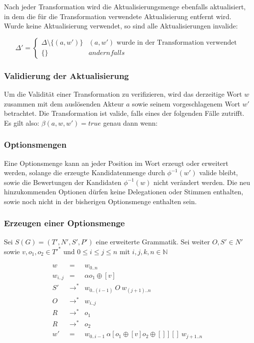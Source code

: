 \documentclass[]{article}
\begin{document}
Nach jeder Transformation wird die Aktualisierungsmenge ebenfalls aktualisiert, in dem die für die Transformation verwendete Aktualisierung entfernt wird. Wurde keine Aktualisierung verwendet, so sind alle Aktualisierungen invalide:

\[ 
  \Delta' = 
  \begin{cases}
    \Delta\setminus \{ (a, w' )\} & (a,w')\text{ wurde in der Transformation verwendet} \\
    \{\} & andernfalls
  \end{cases}
\] 


\subsubsection*{Validierung der Aktualisierung}
Um die Validität einer Transformation zu verifizieren, wird das derzeitige Wort $w$ zusammen mit dem auslösenden Akteur $a$ sowie seinem vorgeschlagenem Wort $w'$ betrachtet. Die Transformation ist valide, falls eines der folgenden Fälle zutrifft.
Es gilt also: $\beta(a,w,w') = true$ genau dann wenn:

\subsubsection*{Optionsmengen}
Eine Optionsmenge kann an jeder Position im Wort erzeugt oder erweitert werden, solange die erzeugte Kandidatenmenge durch $\phi^{-1}(w')$ valide bleibt, sowie die Bewertungen der Kandidaten $\phi^{-1}(w)$ nicht verändert werden. Die neu hinzukommenden Optionen dürfen keine Delegationen oder Stimmen enthalten, sowie noch nicht in der bisherigen Optionsmenge enthalten sein.

\subsubsection*{Erzeugen einer Optionsmenge}

Sei $S(G) = (T', N', S', P')$ eine erweiterte Grammatik. Sei weiter $O,S'\in N'$ sowie $v,o_1,o_2 \in T'^*$ und $0\leq i\leq j\leq n$ mit $i,j,k,n \in \mathbb{N}$

\begin{eqnarray}
  w &=& w_{0..n} \\
  w_{i..j} &=& \alpha o_1 \oplus [v] \\
  S' &\rightarrow^*& w_{0 .. (i-1)}\ O\ w_{(j+1) .. n}\\
  O &\rightarrow^*& w_{i..j} \\
  R &\rightarrow^*& o_1 \\
  R &\rightarrow^*& o_2 \\
  w' &=& w_{0..i-1}\ \alpha [o_1\oplus [v] o_2\oplus []][]\ w_{j+1 .. n}
\end{eqnarray}
\end{document}
